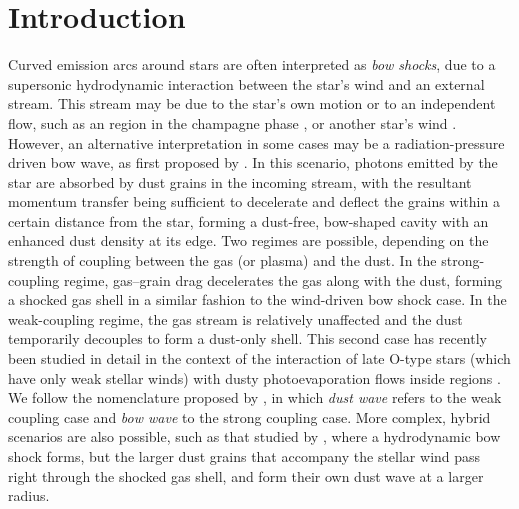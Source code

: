 
\section{Introduction}
\label{sec:introduction}
\newcommand\hii{\ion{H}{ii}}

Curved emission arcs around stars \citep[e.g.,][]{Gull:1979a} are
often interpreted as \textit{bow shocks}, due to a supersonic
hydrodynamic interaction between the star's wind and an external
stream. This stream may be due to the star's own motion or to an
independent flow, such as an \hii{} region in the champagne phase
\citep{Tenorio-Tagle:1979a}, or another star's wind
\citep{Canto:1996}. However, an alternative interpretation in some
cases may be a radiation-pressure driven bow wave, as first proposed
by \citet[\S\textsc{vi}]{van-Buren:1988a}.  In this scenario, photons
emitted by the star are absorbed by dust grains in the incoming
stream, with the resultant momentum transfer being sufficient to
decelerate and deflect the grains within a certain distance from the
star, forming a dust-free, bow-shaped cavity with an enhanced dust
density at its edge.  Two regimes are possible, depending on the
strength of coupling between the gas (or plasma) and the dust.  In the
strong-coupling regime, gas--grain drag decelerates the gas along with
the dust, forming a shocked gas shell in a similar fashion to the
wind-driven bow shock case.  In the weak-coupling regime, the gas
stream is relatively unaffected and the dust temporarily decouples to
form a dust-only shell.  This second case has recently been studied in
detail in the context of the interaction of late O-type stars (which
have only weak stellar winds) with dusty photoevaporation flows inside
\hii{} regions \citep{Ochsendorf:2014a, Ochsendorf:2014b,
  Ochsendorf:2015a}.  We follow the nomenclature proposed by
\citet{Ochsendorf:2014b}, in which \textit{dust wave} refers to the
weak coupling case and \textit{bow wave} to the strong coupling case.
More complex, hybrid scenarios are also possible, such as that studied
by \citet{van-Marle:2011a}, where a hydrodynamic bow shock forms, but
the larger dust grains that accompany the stellar wind pass right
through the shocked gas shell, and form their own dust wave at a
larger radius.

